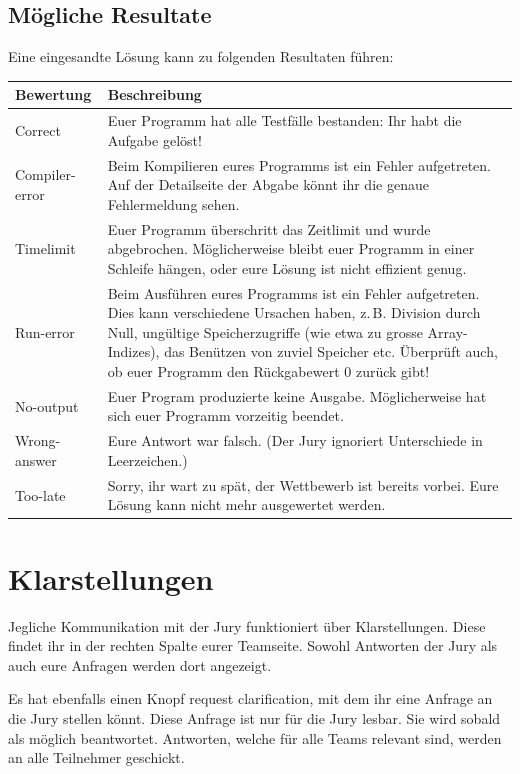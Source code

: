 \subsection{Mögliche Resultate}
Eine eingesandte Lösung kann zu folgenden Resultaten führen:

\begin{center}
\begin{longtable}{|l|p{12.5cm}|}
\hline
\textbf{Bewertung} &
\textbf{Beschreibung}\\\hline
Correct &
Euer Programm hat alle Testfälle bestanden: Ihr habt die Aufgabe gelöst!\\\hline
Compiler-error &
Beim Kompilieren eures Programms ist ein Fehler aufgetreten. Auf der Detailseite
der Abgabe könnt ihr die genaue Fehlermeldung sehen.
\\\hline
Timelimit &
Euer Programm überschritt das Zeitlimit und wurde abgebrochen. Möglicherweise
bleibt euer Programm in einer Schleife hängen, oder eure Lösung ist nicht
effizient genug.\\\hline
Run-error &
Beim Ausführen eures Programms ist ein Fehler aufgetreten. Dies kann
verschiedene Ursachen haben, z.\,B. Division durch Null, ungültige
Speicherzugriffe (wie etwa zu grosse Array-Indizes), das Benützen von
zuviel Speicher etc. Überprüft auch, ob euer Programm den Rückgabewert 0
zurück gibt!\\\hline
No-output&
Euer Program produzierte keine Ausgabe. Möglicherweise hat sich euer
Programm vorzeitig beendet.\\\hline
Wrong-answer&
Eure Antwort war falsch. (Der Jury ignoriert Unterschiede in Leerzeichen.)
\\\hline
Too-late&
Sorry, ihr wart zu spät, der Wettbewerb ist bereits vorbei. Eure Lösung kann
nicht mehr ausgewertet werden.\\\hline
\end{longtable}
\end{center}

\bigskip

\section{Klarstellungen}
Jegliche Kommunikation mit der Jury funktioniert über Klarstellungen. Diese
findet ihr in der rechten Spalte eurer Teamseite. Sowohl Antworten der Jury als
auch eure Anfragen werden dort angezeigt.

Es hat ebenfalls einen Knopf \glqq request clarification\grqq{}, mit dem ihr
eine Anfrage an die Jury stellen könnt. Diese Anfrage ist nur für die Jury
lesbar. Sie wird sobald als möglich beantwortet. Antworten, welche für alle
Teams relevant sind, werden an alle Teilnehmer geschickt.

